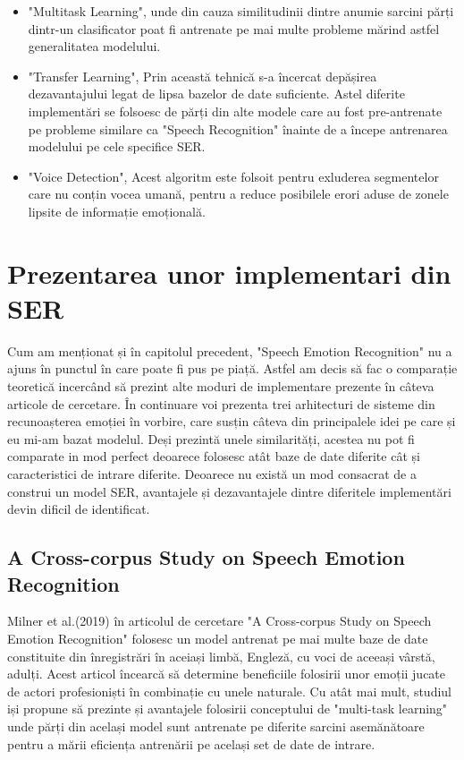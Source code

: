 \documentclass[a4paper,12pt]{book}
\begin{document}
						\begin{itemize}
							\setlength\topsep{0pt}
							\setlength\itemsep{0pt}
							\setlength{\itemindent}{1cm}
							\item "Multitask Learning", unde din cauza similitudinii dintre anumie sarcini părți dintr-un clasificator poat fi antrenate pe mai multe probleme mărind astfel generalitatea modelului.
							\item "Transfer Learning", Prin această tehnică s-a încercat depășirea dezavantajului legat de lipsa bazelor de date suficiente. Astel diferite implementări se folsoesc de părți din alte modele care au fost pre-antrenate pe probleme similare ca "Speech Recognition" înainte de a începe antrenarea modelului pe cele specifice SER.
							\item "Voice Detection", Acest algoritm este folsoit pentru exluderea segmentelor care nu conțin vocea umană, pentru a reduce posibilele erori aduse de zonele lipsite de informație emoțională. 					
					\end{itemize}
				
				
				\section{Prezentarea unor implementari din SER} \label{papers}
					Cum am menționat și în capitolul precedent, "Speech Emotion Recognition" nu a ajuns în punctul în care poate fi pus pe piață. Astfel am decis să fac o comparație teoretică incercând să prezint alte moduri de implementare prezente în câteva articole de cercetare. În continuare voi prezenta trei arhitecturi de sisteme din recunoașterea emoției în vorbire, care susțin câteva din principalele idei pe care și eu mi-am bazat modelul. Deși prezintă unele similarități, acestea nu pot fi comparate in mod perfect deoarece folosesc atât baze de date diferite cât și caracteristici de intrare diferite. Deoarece nu există un mod consacrat de a construi un model SER, avantajele și dezavantajele dintre diferitele implementări devin dificil de identificat. \par		
					
					\subsection{A Cross-corpus Study on Speech Emotion Recognition} \label{prez_multi_domain}
					
					
					Milner et al.(2019) în articolul de cercetare "A Cross-corpus Study on Speech Emotion Recognition" \cite{multi-domain} folosesc un model antrenat pe mai multe baze de date constituite din înregistrări în aceiași limbă, Engleză, cu voci de aceeași vârstă, adulți. Acest articol încearcă să determine beneficiile folosirii  unor emoții jucate de actori profesioniști în combinație cu unele naturale. Cu atât mai mult, studiul iși propune să prezinte și avantajele folosirii conceptului de "multi-task learning" unde părți din același model sunt antrenate pe diferite sarcini asemănătoare pentru a mării eficiența antrenării pe același set de date de intrare. \par
					
\end{document}
